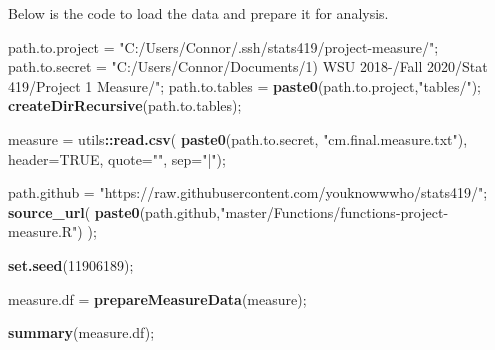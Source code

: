 \documentclass[]{article}
\newenvironment{Shaded}{\begin{snugshade}}{\end{snugshade}}
\newcommand{\DataTypeTok}[1]{\textcolor[rgb]{0.13,0.29,0.53}{#1}}
\newcommand{\DecValTok}[1]{\textcolor[rgb]{0.00,0.00,0.81}{#1}}
\newcommand{\KeywordTok}[1]{\textcolor[rgb]{0.13,0.29,0.53}{\textbf{#1}}}
\newcommand{\NormalTok}[1]{#1}
\newcommand{\OperatorTok}[1]{\textcolor[rgb]{0.81,0.36,0.00}{\textbf{#1}}}
\newcommand{\OtherTok}[1]{\textcolor[rgb]{0.56,0.35,0.01}{#1}}
\newcommand{\StringTok}[1]{\textcolor[rgb]{0.31,0.60,0.02}{#1}}
\begin{document}
Below is the code to load the data and prepare it for analysis.

\begin{Shaded}
\begin{Highlighting}[]
\NormalTok{path.to.project =}\StringTok{ "C:/Users/Connor/.ssh/stats419/project-measure/"}\NormalTok{;}
\NormalTok{path.to.secret =}\StringTok{ }
\StringTok{  "C:/Users/Connor/Documents/1) WSU 2018-/Fall 2020/Stat 419/Project 1 Measure/"}\NormalTok{;}
\NormalTok{path.to.tables =}\StringTok{ }\KeywordTok{paste0}\NormalTok{(path.to.project,}\StringTok{"tables/"}\NormalTok{);}
  \KeywordTok{createDirRecursive}\NormalTok{(path.to.tables);}

\NormalTok{measure =}\StringTok{ }\NormalTok{utils}\OperatorTok{::}\KeywordTok{read.csv}\NormalTok{( }\KeywordTok{paste0}\NormalTok{(path.to.secret, }\StringTok{"cm.final.measure.txt"}\NormalTok{), }\DataTypeTok{header=}\OtherTok{TRUE}\NormalTok{, }
                          \DataTypeTok{quote=}\StringTok{""}\NormalTok{, }\DataTypeTok{sep=}\StringTok{"|"}\NormalTok{);}

\NormalTok{path.github =}\StringTok{ "https://raw.githubusercontent.com/youknowwwho/stats419/"}\NormalTok{;}
\KeywordTok{source_url}\NormalTok{( }\KeywordTok{paste0}\NormalTok{(path.github,}\StringTok{"master/Functions/functions-project-measure.R"}\NormalTok{) );}

\KeywordTok{set.seed}\NormalTok{(}\DecValTok{11906189}\NormalTok{);}

\NormalTok{measure.df =}\StringTok{ }\KeywordTok{prepareMeasureData}\NormalTok{(measure);}

\KeywordTok{summary}\NormalTok{(measure.df);}
\end{Highlighting}
\end{Shaded}
\end{document}
